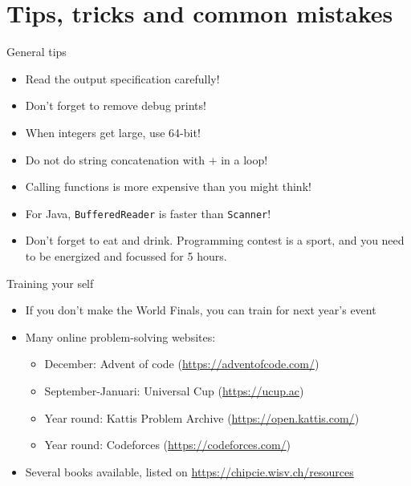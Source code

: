 \documentclass[11pt,pdf, aspectratio=169]{beamer}
\begin{document}
  \section{Tips, tricks and common mistakes}
  \begin{frame}{General tips}
    \begin{itemize}
      \item Read the output specification carefully!
      \item Don’t forget to remove debug prints!
      \item When integers get large, use 64-bit!
      \item Do not do string concatenation with $+$ in a loop!
      \item Calling functions is more expensive than you might think!
      \item For Java, \texttt{BufferedReader} is faster than \texttt{Scanner}!
      \item Don’t forget to eat and drink.
      Programming contest is a sport, and you need to be energized and focussed for 5 hours.
    \end{itemize}
  \end{frame}
  \begin{frame}{Training your self}
    \begin{itemize}
      \item If you don't make the World Finals, you can train for next year's event
      \item Many online problem-solving websites:
      \begin{itemize}
        \item December: Advent of code (\url{https://adventofcode.com/})
        \item September-Januari: Universal Cup (\url{https://ucup.ac})
        \item Year round: Kattis Problem Archive (\url{https://open.kattis.com/})
        \item Year round: Codeforces (\url{https://codeforces.com/})
      \end{itemize}
      \item Several books available, listed on \url{https://chipcie.wisv.ch/resources}
    \end{itemize}
  \end{frame}
\end{document}
